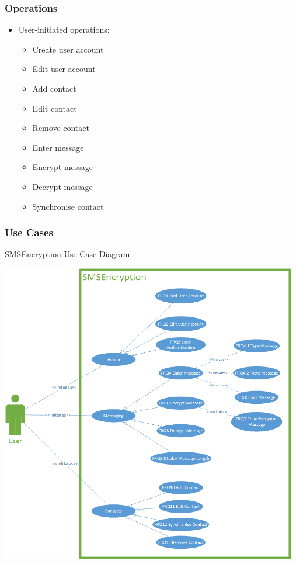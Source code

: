 \subsubsection{Operations}
\begin{itemize}
\item User-initiated operations:
\begin{itemize}
\item Create user account
\item Edit user account
\item Add contact
\item Edit contact
\item Remove contact
\item Enter message
\item Encrypt message
\item Decrypt message
\item Synchronise contact
\end{itemize}
\end{itemize}


\subsubsection{Use Cases}
SMSEncryption Use Case Diagram

\begin{center}
 \includegraphics[width=13cm]{diagrams/UseCaseDiagrams/UsecaseV5.png}
\end{center}

